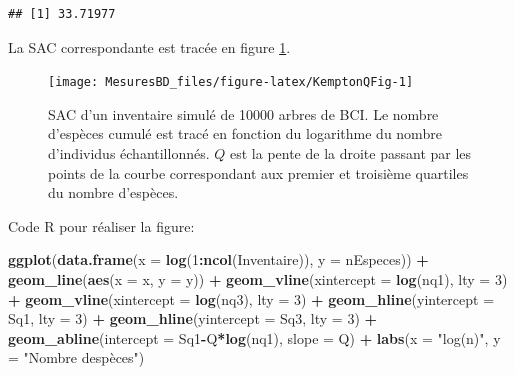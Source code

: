 \documentclass[
  11pt,
  french,
  a4paper,
  extrafontsizes,onecolumn,openright
  ]{memoir}
\newenvironment{Shaded}{\begin{snugshade}}{\end{snugshade}}
\newcommand{\AttributeTok}[1]{\textcolor[rgb]{0.13,0.29,0.53}{#1}}
\newcommand{\DecValTok}[1]{\textcolor[rgb]{0.00,0.00,0.81}{#1}}
\newcommand{\FunctionTok}[1]{\textcolor[rgb]{0.13,0.29,0.53}{\textbf{#1}}}
\newcommand{\NormalTok}[1]{#1}
\newcommand{\SpecialCharTok}[1]{\textcolor[rgb]{0.81,0.36,0.00}{\textbf{#1}}}
\newcommand{\StringTok}[1]{\textcolor[rgb]{0.31,0.60,0.02}{#1}}
\begin{document}
\begin{verbatim}
## [1] 33.71977
\end{verbatim}

\normalsize

La SAC correspondante est tracée en figure \ref{fig:KemptonQFig}.



\scriptsize

\begin{figure}

{\centering \texttt{[image: MesuresBD\_files/figure-latex/KemptonQFig-1]} 

}

\caption{SAC d'un inventaire simulé de 10000 arbres de BCI. Le nombre d'espèces cumulé est tracé en fonction du logarithme du nombre d'individus échantillonnés. \(Q\) est la pente de la droite passant par les points de la courbe correspondant aux premier et troisième quartiles du nombre d'espèces.}\label{fig:KemptonQFig}
\end{figure}

\normalsize

Code R pour réaliser la figure:

\scriptsize

\begin{Shaded}
\begin{Highlighting}[]
\FunctionTok{ggplot}\NormalTok{(}\FunctionTok{data.frame}\NormalTok{(}\AttributeTok{x =} \FunctionTok{log}\NormalTok{(}\DecValTok{1}\SpecialCharTok{:}\FunctionTok{ncol}\NormalTok{(Inventaire)), }\AttributeTok{y =}\NormalTok{ nEspeces)) }\SpecialCharTok{+}
  \FunctionTok{geom\_line}\NormalTok{(}\FunctionTok{aes}\NormalTok{(}\AttributeTok{x =}\NormalTok{ x, }\AttributeTok{y =}\NormalTok{ y)) }\SpecialCharTok{+}
  \FunctionTok{geom\_vline}\NormalTok{(}\AttributeTok{xintercept =} \FunctionTok{log}\NormalTok{(nq1), }\AttributeTok{lty =} \DecValTok{3}\NormalTok{) }\SpecialCharTok{+}
  \FunctionTok{geom\_vline}\NormalTok{(}\AttributeTok{xintercept =} \FunctionTok{log}\NormalTok{(nq3), }\AttributeTok{lty =} \DecValTok{3}\NormalTok{) }\SpecialCharTok{+}
  \FunctionTok{geom\_hline}\NormalTok{(}\AttributeTok{yintercept =}\NormalTok{ Sq1, }\AttributeTok{lty =} \DecValTok{3}\NormalTok{) }\SpecialCharTok{+}
  \FunctionTok{geom\_hline}\NormalTok{(}\AttributeTok{yintercept =}\NormalTok{ Sq3, }\AttributeTok{lty =} \DecValTok{3}\NormalTok{) }\SpecialCharTok{+}
  \FunctionTok{geom\_abline}\NormalTok{(}\AttributeTok{intercept =}\NormalTok{ Sq1}\SpecialCharTok{{-}}\NormalTok{Q}\SpecialCharTok{*}\FunctionTok{log}\NormalTok{(nq1), }\AttributeTok{slope =}\NormalTok{ Q) }\SpecialCharTok{+}
  \FunctionTok{labs}\NormalTok{(}\AttributeTok{x =} \StringTok{"log(n)"}\NormalTok{, }\AttributeTok{y =} \StringTok{"Nombre d\textquotesingle{}espèces"}\NormalTok{)}
\end{Highlighting}
\end{Shaded}
\end{document}

